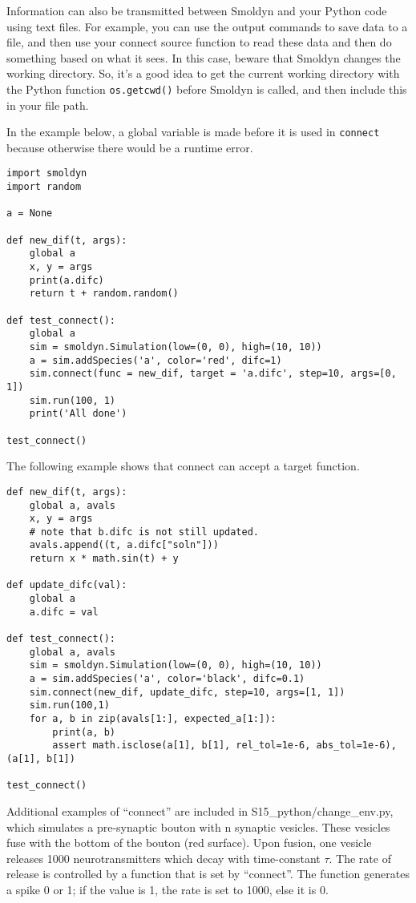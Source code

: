 \documentclass {scrbook}
\newcommand {\ttt} {\texttt}
\begin{document}
Information can also be transmitted between Smoldyn and your Python code using text files. For example, you can use the output commands to save data to a file, and then use your connect source function to read these data and then do something based on what it sees. In this case, beware that Smoldyn changes the working directory. So, it's a good idea to get the current working directory with the Python function \ttt{os.getcwd()} before Smoldyn is called, and then include this in your file path.

In the example below, a global variable is made before it is used in \ttt{connect} because otherwise there would be a runtime error.

\begin{lstlisting}[style=SSAPython]
import smoldyn
import random

a = None

def new_dif(t, args):
    global a
    x, y = args
    print(a.difc)
    return t + random.random()

def test_connect():
    global a
    sim = smoldyn.Simulation(low=(0, 0), high=(10, 10))
    a = sim.addSpecies('a', color='red', difc=1)
    sim.connect(func = new_dif, target = 'a.difc', step=10, args=[0, 1])
    sim.run(100, 1)
    print('All done')

test_connect()
\end{lstlisting}

The following example shows that connect can accept a target function.

\begin{lstlisting}[style=SSAPython]
def new_dif(t, args):
    global a, avals
    x, y = args
    # note that b.difc is not still updated.
    avals.append((t, a.difc["soln"]))
    return x * math.sin(t) + y

def update_difc(val):
    global a
    a.difc = val

def test_connect():
    global a, avals
    sim = smoldyn.Simulation(low=(0, 0), high=(10, 10))
    a = sim.addSpecies('a', color='black', difc=0.1)
    sim.connect(new_dif, update_difc, step=10, args=[1, 1])
    sim.run(100,1)
    for a, b in zip(avals[1:], expected_a[1:]):
        print(a, b)
        assert math.isclose(a[1], b[1], rel_tol=1e-6, abs_tol=1e-6), (a[1], b[1])

test_connect()
\end{lstlisting}

Additional examples of ``connect'' are included in S15\_python/change\_env.py, which simulates a pre-synaptic bouton with n synaptic vesicles. These vesicles fuse with the bottom of the bouton (red surface). Upon fusion, one vesicle releases 1000 neurotransmitters which decay with time-constant $\tau$. The rate of release is controlled by a function that is set by ``connect''. The function generates a spike 0 or 1; if the value is 1, the rate is set to 1000, else it is 0.
\end{document}
